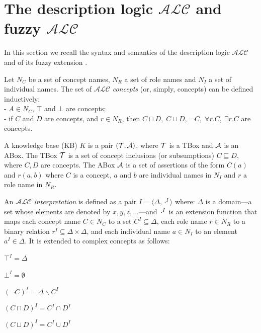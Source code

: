 \documentclass[runningheads]{llncs}
\newcommand {\vuoto} {\emptyset}
\newcommand{\alc}{\mathcal{ALC}}
\begin{document}
\section{The description logic $\alc$ and fuzzy $\alc$}  \label{sec:ALC}

In this section we recall the syntax and semantics of the description logic $\alc$ \cite{handbook} and of its fuzzy extension \cite{LukasiewiczStraccia09}. 

Let ${N_C}$ be a set of concept names, ${N_R}$ a set of role names
  and ${N_I}$ a set of individual names.  
%
The set  of $\alc$ \emph{concepts} (or, simply, concepts) can be
defined inductively: \\ %
- $A \in N_C$, $\top$ and $\bot$ are {concepts};\\
- if $C$ and $ D$ are concepts, and $r \in N_R$, then $C \sqcap D,\; C \sqcup D,\; \neg C, \; \forall r.C,\; \exists r.C$ 
are {concepts}.

\noindent
A knowledge base (KB) $K$ is a pair $({\cal T}, {\cal A})$, where ${\cal T}$ is a TBox and
${\cal A}$ is an ABox.
The TBox ${\cal T}$ is  a set of concept inclusions (or subsumptions) $C \sqsubseteq D$, where $C,D$ are concepts.
The  ABox ${\cal A}$ is  a set of assertions of the form $C(a)$ and $r(a,b)$
where $C$ is a  concept, $a$ and $b$ are individual names in $N_I$ and $r$ a role name in $N_R$.




An  $\alc$ {\em interpretation}  is defined as a pair $I=\langle \Delta, \cdot^I \rangle$ where:
$\Delta$ is a domain---a set whose elements are denoted by $x, y, z, \dots$---and 
$\cdot^I$ is an extension function that maps each
concept name $C\in N_C$ to a set $C^I \subseteq  \Delta$, 
each role name $r \in N_R$ to  a binary relation $r^I \subseteq  \Delta \times  \Delta$,
and each individual name $a\in N_I$ to an element $a^I \in  \Delta$.
It is extended to complex concepts  as follows:

$\top^I=\Delta$  \ \ \ \ \ \ \  

$\bot^I=\vuoto$  \ \ \ \ \ \ \  

$(\neg C)^I=\Delta \backslash C^I$

$(C \sqcap D)^I=C^I \cap D^I$

$(C \sqcup D)^I=C^I \cup D^I$
\end{document}
